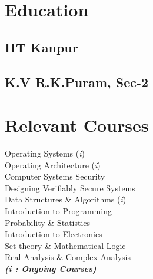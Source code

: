\documentclass[]{deedy-resume-openfont}
\begin{document}
\begin{minipage}[t]{0.30\textwidth} 

\vspace{-0.5cm}
\section{Education} 

\subsection{IIT Kanpur}
\sectionsep{}

\subsection{K.V R.K.Puram, Sec-2}
\sectionsep{}
%


\section{Relevant Courses}
Operating Systems (\textit{i}) \\
Operating Architecture (\textit{i}) \\
Computer Systems Security \\
Designing Verifiably Secure Systems \\
Data Structures \& Algorithms (\textit{i}) \\
Introduction to Programming \\
Probability \& Statistics \\
Introduction to Electronics \\
Set theory \& Mathematical Logic \\
Real Analysis \& Complex Analysis\\


{\footnotesize \textit{\textbf{ (i : Ongoing Courses)}}}


\end{minipage}
\end{document}

